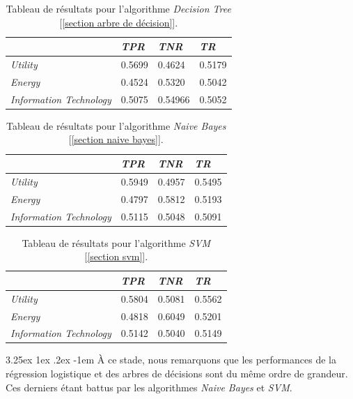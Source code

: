 \documentclass[a4paper, 11pt]{article}
\makeatletter
\renewcommand\paragraph{\@startsection{paragraph}{5}{\z@}%
  {3.25ex \@plus1ex \@minus.2ex}%
  {-1em}%
  {\normalfont\normalsize\bfseries}}
\makeatother
\begin{document}
\begin{table}[h!]
	\centering
\begin{tabular}{|l|l|l|l|}
	\hline
	\ & \textit{TPR} & \textit{TNR} & \textit{TR}\\
	\hline
	\textit{Utility} & 0.5699 & 0.4624 & 0.5179 \\
	\hline
	\textit{Energy} & 0.4524 & 0.5320 & 0.5042\\
	\hline
	\textit{Information Technology} & 0.5075 & 0.54966 & 0.5052\\
	\hline
\end{tabular}
\caption[]{Tableau de résultats pour l'algorithme \textit{Decision Tree} [\ref{section arbre de décision}].}
\end{table}



\begin{table}[h!]
	\centering
\begin{tabular}{|l|l|l|l|}
	\hline
	\ & \textit{TPR} & \textit{TNR} & \textit{TR}\\
	\hline
	\textit{Utility} & 0.5949 & 0.4957 & 0.5495 \\
	\hline
	\textit{Energy} & 0.4797 & 0.5812 & 0.5193\\
	\hline
	\textit{Information Technology} & 0.5115 & 0.5048 & 0.5091\\
	\hline
\end{tabular}
\caption[]{Tableau de résultats pour l'algorithme \textit{Naive Bayes} [\ref{section naive bayes}].}
\end{table}


\begin{table}[H]
	\centering
\begin{tabular}{|l|l|l|l|}
	\hline
	\ & \textit{TPR} & \textit{TNR} & \textit{TR}\\
	\hline
	\textit{Utility} & 0.5804 & 0.5081 & 0.5562 \\
	\hline
	\textit{Energy} & 0.4818 & 0.6049 & 0.5201\\
	\hline
	\textit{Information Technology} & 0.5142 & 0.5040 & 0.5149\\
	\hline
\end{tabular}
\caption{Tableau de résultats pour l'algorithme \textit{SVM} [\ref{section svm}].}
\end{table}


\paragraph{}
À ce stade, nous remarquons que les performances de la régression logistique et des arbres de décisions sont du même ordre de grandeur. Ces derniers étant battus par les algorithmes \textit{Naive Bayes} et \textit{SVM}.
\end{document}
